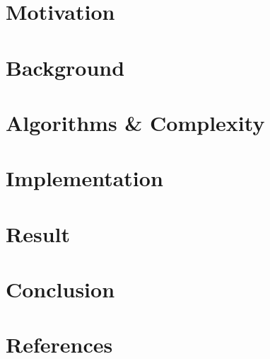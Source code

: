 
\usepackage{amsmath}
\usepackage{setspace}
\usepackage{amssymb}
\usepackage{amsthm}
\usepackage{listings}
\usepackage{tikz}
\usepackage{csvsimple}
\usepackage{minted}
\usepackage{fancyvrb}
\usepackage{multicol}
\setlength{\parindent}{0pt}

\lstset{breaklines=true, showstringspaces=false,
    basicstyle=\footnotesize\ttfamily
}


\doublespacing

\MYHEADERS
{}

    \section{Motivation}
    \section{Background}
    \section{Algorithms \& Complexity}
    \section{Implementation}
    \section{Result}
    \section{Conclusion}

    \section{References}
      
      







